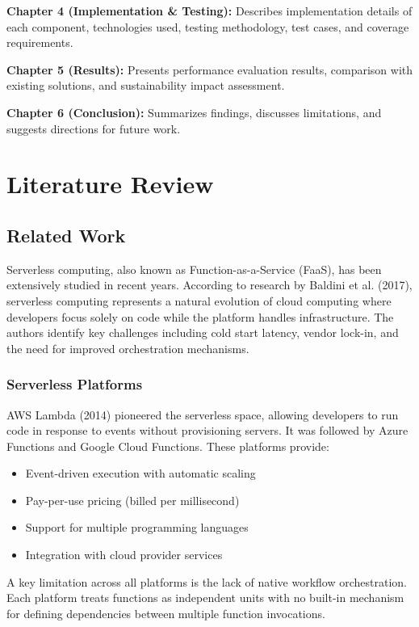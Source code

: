 \documentclass{fisatprojectfinal}
\begin{document}
\textbf{Chapter 4 (Implementation \& Testing):} Describes implementation details of each component, technologies used, testing methodology, test cases, and coverage requirements.

\textbf{Chapter 5 (Results):} Presents performance evaluation results, comparison with existing solutions, and sustainability impact assessment.

\textbf{Chapter 6 (Conclusion):} Summarizes findings, discusses limitations, and suggests directions for future work.

\chapter{Literature Review}

\section{Related Work}
Serverless computing, also known as Function-as-a-Service (FaaS), has been extensively studied in recent years. According to research by Baldini et al. (2017), serverless computing represents a natural evolution of cloud computing where developers focus solely on code while the platform handles infrastructure. The authors identify key challenges including cold start latency, vendor lock-in, and the need for improved orchestration mechanisms.

\subsection{Serverless Platforms}
AWS Lambda (2014) pioneered the serverless space, allowing developers to run code in response to events without provisioning servers. It was followed by Azure Functions and Google Cloud Functions. These platforms provide:
\begin{itemize}
    \item Event-driven execution with automatic scaling
    \item Pay-per-use pricing (billed per millisecond)
    \item Support for multiple programming languages
    \item Integration with cloud provider services
\end{itemize}

A key limitation across all platforms is the lack of native workflow orchestration. Each platform treats functions as independent units with no built-in mechanism for defining dependencies between multiple function invocations.
\end{document}
